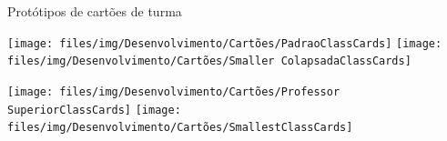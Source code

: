 \begin{MyCenteredFigure}
  \caption{Protótipos de cartões de turma}
  \label{fig:cartão_de_turma}
  \begin{minipage}{0.48\textwidth} \centering
    \texttt{[image: files/img/Desenvolvimento/Cartões/PadraoClassCards]}
    \vspace{1mm} \vfill
    \texttt{[image: files/img/Desenvolvimento/Cartões/Smaller ColapsadaClassCards]}
  \end{minipage}
  \hfill
  \begin{minipage}{0.48\textwidth} \centering
    \texttt{[image: files/img/Desenvolvimento/Cartões/Professor SuperiorClassCards]}
    \vspace{1mm} \vfill
    \texttt{[image: files/img/Desenvolvimento/Cartões/SmallestClassCards]}
  \end{minipage}
\end{MyCenteredFigure}
